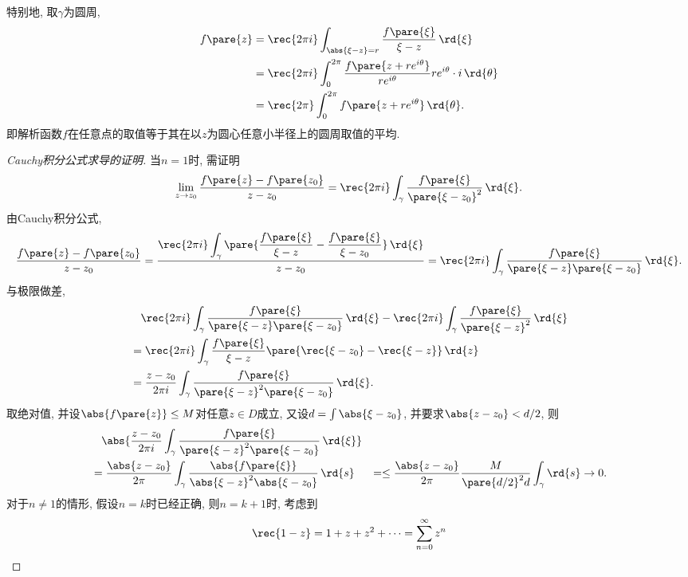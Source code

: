 \documentclass{ctexart}
\begin{document}
\begin{remark}
    特别地, 取$\gamma$为圆周,
    \begin{align}
        f\pare{z} &= \rec{2\pi i} \int_{\abs{\xi - z} = r} \frac{f\pare{\xi}}{\xi - z}\,\rd{\xi} \\
        &= \rec{2\pi i} \int_0^{2\pi} \frac{f\pare{z+re^{i\theta}}}{re^{i\theta}}re^{i\theta}\cdot i\,\rd{\theta} \\
        \label{eq:点值作为平均值}
        &= \rec{2\pi} \int_0^{2\pi} f\pare{z+re^{i\theta}}\,\rd{\theta}.
    \end{align}
    即解析函数$f$在任意点的取值等于其在以$z$为圆心任意小半径上的圆周取值的平均.
\end{remark}
\begin{proof}[Cauchy积分公式求导的证明]
    当$n=1$时, 需证明
    \[ \lim_{z\rightarrow z_0} \frac{f\pare{z} - f\pare{z_0}}{z - z_0} = \rec{2\pi i} \int_\gamma \frac{f\pare{\xi}}{\pare{\xi - z_0}^2}\,\rd{\xi}. \]
    由Cauchy积分公式,
    \[ \frac{f\pare{z} - f\pare{z_0}}{z-z_0} = \frac{\displaystyle \rec{2\pi i}\int_\gamma \pare{\frac{f\pare{\xi}}{\xi - z} - \frac{f\pare{\xi}}{\xi - z_0}} \,\rd{\xi}}{z-z_0} = \rec{2\pi i} \int_\gamma \frac{f\pare{\xi}}{\pare{\xi - z}\pare{\xi - z_0}}\,\rd{\xi}. \]
    与极限做差,
    \begin{align*}
        &\phantom{=}\,\rec{2\pi i} \int_\gamma \frac{f\pare{\xi}}{\pare{\xi - z}\pare{\xi - z_0}}\,\rd{\xi} - \rec{2\pi i}\int_\gamma \frac{f\pare{\xi}}{\pare{\xi - z}^2}\,\rd{\xi}\\
        &= \rec{2\pi i} \int_\gamma \frac{f\pare{\xi}}{\xi - z} \pare{\rec{\xi - z_0} - \rec{\xi - z}}\,\rd{z} \\
        &= \frac{z - z_0}{2\pi i} \int_\gamma \frac{f\pare{\xi}}{\pare{\xi - z}^2\pare{\xi - z_0}}\,\rd{\xi}.
    \end{align*}
    取绝对值, 并设$\abs{f\pare{z}} \le M$对任意$z\in D$成立, 又设$d = \int \abs{\xi - z_0}$, 并要求$\abs{z-z_0}<d/2$, 则
    \begin{align*}
        & \phantom{=}\, \abs{\frac{z - z_0}{2\pi i} \int_\gamma \frac{f\pare{\xi}}{\pare{\xi - z}^2\pare{\xi - z_0}}\,\rd{\xi}} \\
        &= \frac{\abs{z-z_0}}{2\pi} \int_\gamma \frac{\abs{f\pare{\xi}}}{\abs{\xi - z}^2 \abs{\xi - z_0}}\,\rd{s}
        &= \le \frac{\abs{z-z_0}}{2\pi} \frac{M}{\pare{d/2}^2 d}\int_\gamma \rd{s} \rightarrow 0.
    \end{align*}
    对于$n\neq 1$的情形, 假设$n=k$时已经正确, 则$n=k+1$时, 考虑到
    \[ \rec{1-z} = 1+z+z^2+\cdots = \sum_{n=0}^\infty z^n \]

\end{proof}
\end{document}
